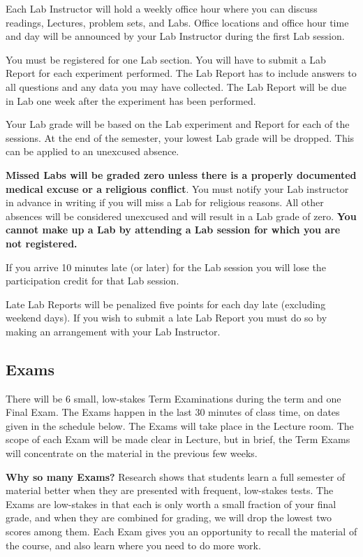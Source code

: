 \documentclass[12pt]{article}
\begin{document}
Each Lab Instructor will hold a weekly office hour where you can
discuss readings, Lectures, problem sets, and Labs.
Office locations and office hour time and day will be announced by
your Lab Instructor during the first Lab session.

You must be
registered for one Lab section. You will have to submit a Lab Report
for each experiment performed. The Lab Report has to include answers
to all questions and any data you may have collected. The Lab Report
will be due in Lab one week after the experiment has been performed.

Your Lab grade will be based on the Lab experiment and Report
for each of the sessions.  At the end of the semester, your lowest Lab
grade will be dropped. This can be applied to an unexcused absence.

\textbf{Missed Labs will be graded zero unless there is a properly
  documented medical excuse or a religious conflict}. You must notify
your Lab instructor in advance in writing if you will miss a Lab for
religious reasons. All other absences will be considered unexcused and
will result in a Lab grade of zero. \textbf{You cannot make up a Lab by
attending a Lab session for which you are not registered.}

If you arrive 10 minutes late (or later) for the Lab session you will
lose the participation credit for that Lab session.

Late Lab Reports will be penalized five points for each day late
(excluding weekend days). If you wish to submit a late Lab Report you
must do so by making an arrangement with your Lab Instructor.

\subsection*{Exams}

There will be 6 small, low-stakes Term Examinations during the term
and one Final Exam. The Exams happen in the last 30 minutes of class
time, on dates given in the schedule below. The Exams will take place
in the Lecture room. The scope of each Exam will be made clear in
Lecture, but in brief, the Term Exams will concentrate on the material
in the previous few weeks.

\textbf{Why so many Exams?} Research shows that students learn a full
semester of material better when they are presented with frequent,
low-stakes tests. The Exams are low-stakes in that each is only worth
a small fraction of your final grade, and when they are combined for
grading, we will drop the lowest two scores among them. Each Exam
gives you an opportunity to recall the material of the course, and
also learn where you need to do more work.
\end{document}
